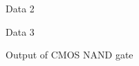 \begin{figure}[hbtp]
  \centering
  
  \caption{\label{fig:data2} Data 2}
\end{figure}

\begin{figure}[hbtp]
  \centering
  
  \caption{\label{fig:data3} Data 3}
\end{figure}

\begin{figure}[hbtp]
  \centering
  
  \caption{\label{fig:data4} Output of CMOS NAND gate}
\end{figure}



